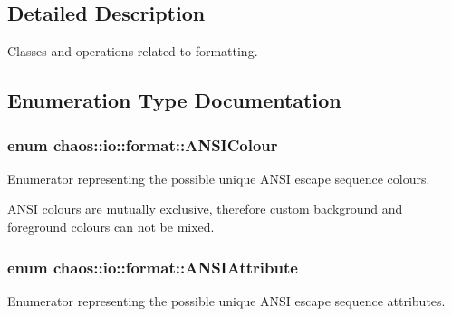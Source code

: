 \subsection{Detailed Description}
Classes and operations related to formatting. 

\subsection{Enumeration Type Documentation}
\hypertarget{namespacechaos_1_1io_1_1format_aa30dcff2478ffc94e33504c8886a5b1a}{}
\subsubsection[{A\+N\+S\+I\+Colour}]{\setlength{\rightskip}{0pt plus 5cm}enum {\bf chaos\+::io\+::format\+::\+A\+N\+S\+I\+Colour}}\label{namespacechaos_1_1io_1_1format_aa30dcff2478ffc94e33504c8886a5b1a}


Enumerator representing the possible unique A\+N\+S\+I escape sequence colours. 

A\+N\+S\+I colours are mutually exclusive, therefore custom background and foreground colours can not be mixed. \hypertarget{namespacechaos_1_1io_1_1format_af01119682ec0bc616b49641e0c2a7ccf}{}
\subsubsection[{A\+N\+S\+I\+Attribute}]{\setlength{\rightskip}{0pt plus 5cm}enum {\bf chaos\+::io\+::format\+::\+A\+N\+S\+I\+Attribute}}\label{namespacechaos_1_1io_1_1format_af01119682ec0bc616b49641e0c2a7ccf}


Enumerator representing the possible unique A\+N\+S\+I escape sequence attributes. 


